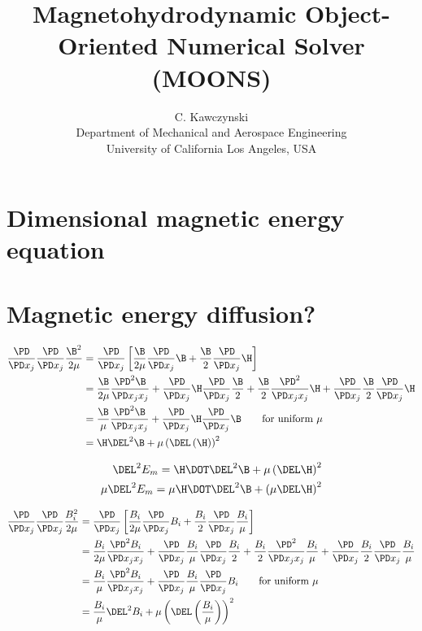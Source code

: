 \documentclass[11pt]{article}
\begin{document}
\doublespacing
\title{Magnetohydrodynamic Object-Oriented Numerical Solver (MOONS)}
\author{C. Kawczynski \\
Department of Mechanical and Aerospace Engineering \\
University of California Los Angeles, USA\\
}
\maketitle

\section{Dimensional magnetic energy equation}

\section{Magnetic energy diffusion?}
\begin{align}
	\frac{\PD}{\PD x_j} \frac{\PD}{\PD x_j} \frac{\B^2}{2 \mu}
	& =
	\frac{\PD}{\PD x_j}
	\left[
	\frac{\B}{2\mu} \frac{\PD}{\PD x_j} \B +
	\frac{\B}{2} \frac{\PD}{\PD x_j} \H
	\right] \\
	& =
	\frac{\B}{2\mu} \frac{\PD^2 \B}{\PD x_jx_j} +
	\frac{\PD}{\PD x_j} \H \frac{\PD}{\PD x_j} \frac{\B}{2} +
	\frac{\B}{2} \frac{\PD^2 }{\PD x_jx_j} \H +
	\frac{\PD}{\PD x_j} \frac{\B}{2} \frac{\PD}{\PD x_j} \H \\
	& =
	\frac{\B}{\mu} \frac{\PD^2 \B}{\PD x_jx_j} +
	\frac{\PD}{\PD x_j} \H \frac{\PD}{\PD x_j} \B \qquad \text{for uniform $\mu$} \\
	& = \H \DEL^2 \B + \mu \left(\DEL \left( \H \right) \right)^2
\end{align}

\begin{equation}\begin{aligned}
	\DEL^2 E_m = \H \DOT \DEL^2 \B + \mu \left( \DEL \H \right)^2 \\
	\mu \DEL^2 E_m = \mu \H \DOT \DEL^2 \B + \left( \mu \DEL \H \right)^2 \\
\end{aligned}\end{equation}

\begin{align}
	\frac{\PD}{\PD x_j} \frac{\PD}{\PD x_j} \frac{B_i^2}{2 \mu}
	& =
	\frac{\PD}{\PD x_j}
	\left[
	\frac{B_i}{2\mu} \frac{\PD}{\PD x_j} B_i +
	\frac{B_i}{2} \frac{\PD}{\PD x_j} \frac{B_i}{\mu}
	\right] \\
	& =
	\frac{B_i}{2\mu} \frac{\PD^2 B_i}{\PD x_jx_j} +
	\frac{\PD}{\PD x_j} \frac{B_i}{\mu} \frac{\PD}{\PD x_j} \frac{B_i}{2} +
	\frac{B_i}{2} \frac{\PD^2 }{\PD x_jx_j} \frac{B_i}{\mu} +
	\frac{\PD}{\PD x_j} \frac{B_i}{2} \frac{\PD}{\PD x_j} \frac{B_i}{\mu} \\
	& =
	\frac{B_i}{\mu} \frac{\PD^2 B_i}{\PD x_jx_j} +
	\frac{\PD}{\PD x_j} \frac{B_i}{\mu} \frac{\PD}{\PD x_j} B_i \qquad \text{for uniform $\mu$} \\
	& = \frac{B_i}{\mu} \DEL^2 B_i + \mu \left(\DEL \left( \frac{B_i}{\mu} \right) \right)^2
\end{align}
\end{document}
